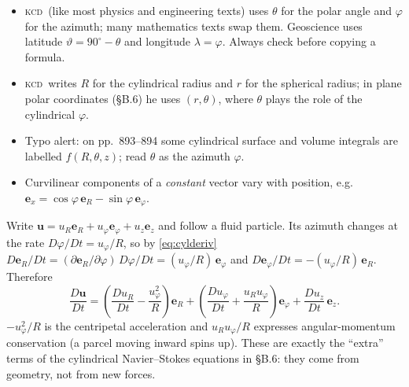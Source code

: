 \documentclass[11pt,letterpaper]{article}
\numberwithin{equation}{section}
\newcommand{\uu}{\mathbf{u}}
\newcommand{\e}[1]{\mathbf{e}_{#1}}
\newcommand{\Dt}[1]{\frac{D #1}{Dt}}
\newcommand{\Kundu}{\textnormal{\textsc{kcd}}}   %
\begin{document}
\begin{pitfall}
\begin{itemize}[leftmargin=1.2em]
  \item \Kundu\ (like most physics and engineering texts) uses $\theta$ for the polar angle and $\varphi$ for the azimuth; many
        mathematics texts swap them. Geoscience uses latitude $\vartheta=90^\circ-\theta$ and longitude $\lambda=\varphi$.
        Always check before copying a formula.
  \item \Kundu\ writes $R$ for the cylindrical radius and $r$ for the spherical radius; in plane polar coordinates
        (\S B.6) he uses $(r,\theta)$, where $\theta$ plays the role of the cylindrical $\varphi$.
  \item Typo alert: on pp.~893--894 some cylindrical surface and volume integrals are labelled $f(R,\theta,z)$; read
        $\theta$ as the azimuth $\varphi$.
  \item Curvilinear components of a \emph{constant} vector vary with position, e.g.\ $\e{x}=\cos\varphi\,\e{R}-\sin\varphi\,\e{\varphi}$.
\end{itemize}
\end{pitfall}

\begin{worked}\label{we:cylaccel}
Write $\uu=u_R\e{R}+u_\varphi\e{\varphi}+u_z\e{z}$ and follow a fluid particle. Its azimuth changes at the rate
$D\varphi/Dt=u_\varphi/R$, so by \eqref{eq:cylderiv}
$D\e{R}/Dt=(\partial\e{R}/\partial\varphi)\,D\varphi/Dt=(u_\varphi/R)\,\e{\varphi}$ and $D\e{\varphi}/Dt=-(u_\varphi/R)\,\e{R}$. Therefore
\begin{equation}\label{eq:cylaccel}
\Dt{\uu}=\left(\Dt{u_R}-\frac{u_\varphi^2}{R}\right)\e{R}+\left(\Dt{u_\varphi}+\frac{u_Ru_\varphi}{R}\right)\e{\varphi}+\Dt{u_z}\,\e{z}.
\end{equation}
$-u_\varphi^2/R$ is the centripetal acceleration and $u_Ru_\varphi/R$ expresses angular-momentum conservation (a parcel moving inward
spins up). These are exactly the ``extra'' terms of the cylindrical Navier--Stokes equations in \S B.6: they come from geometry,
not from new forces.
\end{worked}
\end{document}
